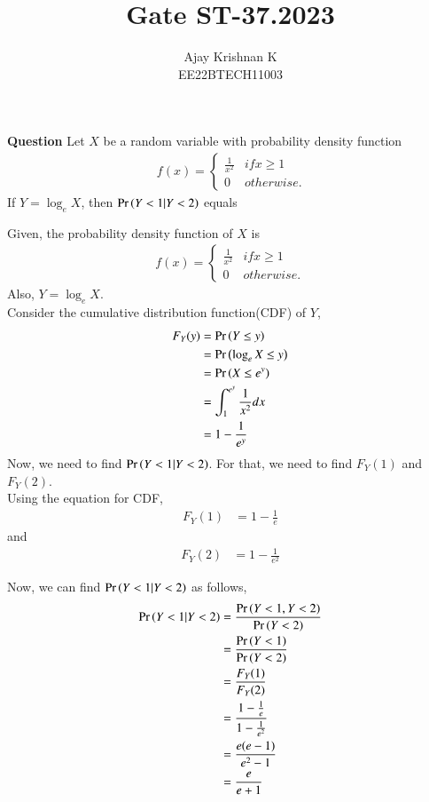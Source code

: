 \documentclass[journal,11pt]{IEEEtran}
\begin{document}
\vspace{3cm}
\author{Ajay Krishnan K\\EE22BTECH11003}

\title{Gate ST-37.2023}
\maketitle

\textbf{Question}
Let $X$ be a random variable with probability density function
\begin{align}\
    f(x) = \begin{cases}
        \frac{1}{x^2} & if x \geq 1\\
        0  & otherwise.
        \end{cases}
\end{align}
If $Y = \log_e X$, then $\Pr\left(Y<1 | Y<2 \right)$ equals

\solution
Given, the probability density function of $X$ is
\begin{align}
    f(x) = \begin{cases}
        \frac{1}{x^2} & if x \geq 1\\
        0  & otherwise.
        \end{cases}
\end{align}
Also, $Y = \log_e X$.\\
Consider the cumulative distribution function(CDF) of $Y$,
\begin{align}
    F_Y(y) &= \Pr\left(Y \leq y\right)\\
    &= \Pr\left(\log_e X \leq y\right)\\
    &= \Pr\left(X \leq e^y\right)\\
    &= \int_{1}^{e^y} \frac{1}{x^2} dx\\
    &= 1 - \frac{1}{e^y}
\end{align}
Now, we need to find $\Pr\left(Y<1 | Y<2 \right)$.
For that, we need to find $F_Y(1)$ and $F_Y(2)$.\\
Using the equation for CDF,
\begin{align}
    F_Y(1) &= 1 - \frac{1}{e}
\end{align}
and
\begin{align}
    F_Y(2) &= 1 - \frac{1}{e^2}
\end{align}

Now, we can find $\Pr\left(Y<1 | Y<2 \right)$ as follows,
\begin{align}
    \Pr\left(Y<1 | Y<2 \right) &= \frac{\Pr\left(Y<1 , Y<2\right)}{\Pr\left(Y<2\right)}\\
    &= \frac{\Pr\left(Y<1\right)}{\Pr\left(Y<2\right)}\\
    &= \frac{F_Y(1)}{F_Y(2)}\\
    &= \frac{1 - \frac{1}{e}}{1 - \frac{1}{e^2}}\\
    &= \frac{e(e-1)}{e^2-1}\\
    &= \frac{e}{e+1}
\end{align}
\end{document}
